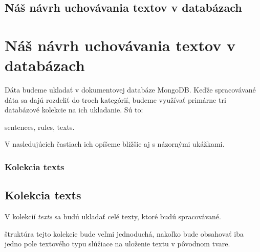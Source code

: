%
%
{
	\subsection{Náš návrh uchovávania textov v databázach}
}
{
	\section{Náš návrh uchovávania textov v databázach}
}
\label{subsection:our_design_persisting_data}
Dáta budeme ukladať v dokumentovej databáze MongoDB. Keďže spracovávané dáta sa dajú rozdeliť do troch kategórií, budeme využívať primárne tri databázové kolekcie na ich ukladanie. Sú to:

\begin{my_itemize}
	\myitem sentences,
	\myitem rules,
	\myitem texts.
\end{my_itemize}
	
V nasledujúcich častiach ich opíšeme bližšie aj s názornými ukážkami.

%
%
{
	\subsubsection{Kolekcia texts}
}
{
	\subsection{Kolekcia texts}
}
V kolekcií \textit{texts} sa budú ukladať celé texty, ktoré budú spracovávané. 

štruktúra tejto kolekcie bude veľmi jednoduchá, nakoľko bude obsahovať iba jedno pole textového typu slúžiace na uloženie textu v pôvodnom tvare.

